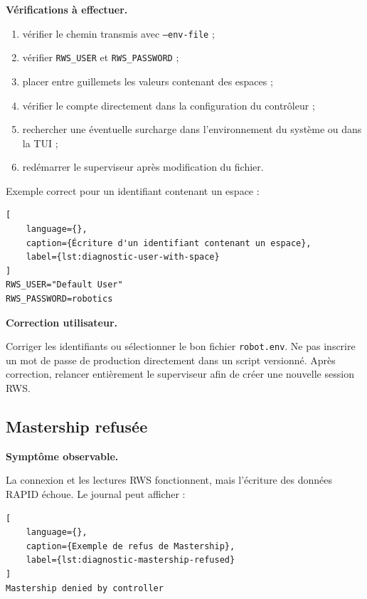 \documentclass{rapportENSAM}
\begin{document}
\textbf{Vérifications à effectuer.}

\begin{enumerate}
    \item vérifier le chemin transmis avec \texttt{--env-file} ;
    \item vérifier \texttt{RWS\_USER} et \texttt{RWS\_PASSWORD} ;
    \item placer entre guillemets les valeurs contenant des espaces ;
    \item vérifier le compte directement dans la configuration du contrôleur ;
    \item rechercher une éventuelle surcharge dans l'environnement du système
    ou dans la TUI ;
    \item redémarrer le superviseur après modification du fichier.
\end{enumerate}

Exemple correct pour un identifiant contenant un espace :

\begin{lstlisting}[
    language={},
    caption={Écriture d'un identifiant contenant un espace},
    label={lst:diagnostic-user-with-space}
]
RWS_USER="Default User"
RWS_PASSWORD=robotics
\end{lstlisting}

\textbf{Correction utilisateur.}

Corriger les identifiants ou sélectionner le bon fichier
\texttt{robot.env}. Ne pas inscrire un mot de passe de production directement
dans un script versionné. Après correction, relancer entièrement le
superviseur afin de créer une nouvelle session RWS.


\subsection{Mastership refusée}
\label{subsec:diagnostic-mastership}

\textbf{Symptôme observable.}

La connexion et les lectures RWS fonctionnent, mais l'écriture des données
RAPID échoue. Le journal peut afficher :

\begin{lstlisting}[
    language={},
    caption={Exemple de refus de Mastership},
    label={lst:diagnostic-mastership-refused}
]
Mastership denied by controller
\end{lstlisting}
\end{document}
